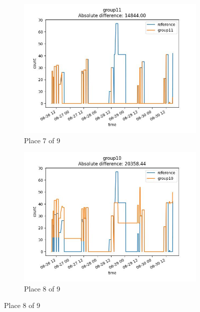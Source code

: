 \begin{figure}
    \center
    \begin{subfigure}[b]{0.45\textwidth}
        \includegraphics[width=\linewidth]{figures/ref-group11.jpeg}
        \caption{Place 7 of 9}
    \end{subfigure}
    \begin{subfigure}[b]{0.45\textwidth}
        \includegraphics[width=\linewidth]{figures/ref-group10.jpeg}
        \caption{Place 8 of 9}
    \end{subfigure}


\end{figure}
